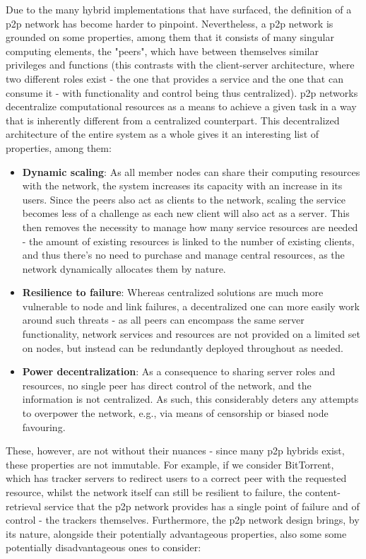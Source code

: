     Due to the many hybrid implementations that have surfaced, the definition of a \gls{p2p} network has become harder to pinpoint.
    Nevertheless, a \gls{p2p} network is grounded on some properties, among them that it consists of many singular computing elements, the "peers", which have between themselves similar privileges and functions (this contrasts with the client-server architecture, where two different roles exist - the one that provides a service and the one that can consume it - with functionality and control being thus centralized).
    \gls{p2p} networks decentralize computational resources as a means to achieve a given task in a way that is inherently different from a centralized counterpart.
    This decentralized architecture of the entire system as a whole gives it an interesting list of properties, among them:

\begin{itemize}
    \item \textbf{Dynamic scaling}: As all member nodes can share their computing resources with the network, the system increases its capacity with an increase in its users.
        Since the peers also act as clients to the network, scaling the service becomes less of a challenge as each new client will also act as a server.
        This then removes the necessity to manage how many service resources are needed - the amount of existing resources is linked to the number of existing clients, and thus there's no need to purchase and manage central resources, as the network dynamically allocates them by nature.
    \item \textbf{Resilience to failure}: Whereas centralized solutions are much more vulnerable to node and link failures, a decentralized one can more easily work around such threats - as all peers can encompass the same server functionality, network services and resources are not provided on a limited set on nodes, but instead can be redundantly deployed throughout as needed.
    \item \textbf{Power decentralization}: As a consequence to sharing server roles and resources, no single peer has direct control of the network, and the information is not centralized.
        As such, this considerably deters any attempts to overpower the network, e.g., via means of censorship or biased node favouring.
\end{itemize}

    These, however, are not without their nuances - since many \gls{p2p} hybrids exist, these properties are not immutable.
    For example, if we consider BitTorrent, which has tracker servers to redirect users to a correct peer with the requested resource, whilst the network itself can still be resilient to failure, the content-retrieval service that the \gls{p2p} network provides has a single point of failure and of control - the trackers themselves.
    Furthermore, the \gls{p2p} network design brings, by its nature, alongside their potentially advantageous properties, also some some potentially disadvantageous ones to consider:

